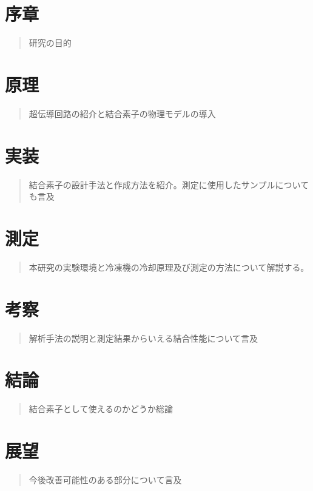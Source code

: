 \documentclass[uplatex,openany,oneside,a4j,11pt]{jsbook}
\begin{document}
\chapter{序章}
    \begin{abstract}
        研究の目的
    \end{abstract}
    

\chapter{原理}
    \begin{abstract}
        超伝導回路の紹介と結合素子の物理モデルの導入
    \end{abstract}
    

\chapter{実装}
    \begin{abstract}
        結合素子の設計手法と作成方法を紹介。測定に使用したサンプルについても言及
    \end{abstract}
    

\chapter{測定}
    \begin{abstract}
        本研究の実験環境と冷凍機の冷却原理及び測定の方法について解説する。
    \end{abstract}
    

\chapter{考察}
    \begin{abstract}
        解析手法の説明と測定結果からいえる結合性能について言及
    \end{abstract}
    

\chapter{結論}
    \begin{abstract}
        結合素子として使えるのかどうか総論
    \end{abstract}
    

\chapter{展望}
    \begin{abstract}
        今後改善可能性のある部分について言及
    \end{abstract}
    
\end{document}

